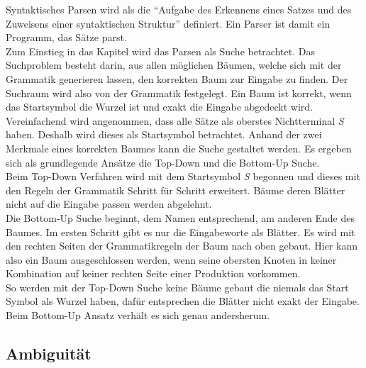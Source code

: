 Syntaktisches Parsen wird als die ``Aufgabe des Erkennens eines Satzes und des Zuweisens einer syntaktischen Struktur'' definiert. %
Ein Parser ist damit ein Programm, das Sätze parst.\\
Zum Einstieg in das Kapitel wird das Parsen als Suche betrachtet. Das Suchproblem besteht darin, aus allen möglichen Bäumen, welche sich mit der Grammatik generieren lassen, den korrekten Baum zur Eingabe zu finden. Der Suchraum wird also von der Grammatik festgelegt. Ein Baum ist korrekt, wenn das Startsymbol die Wurzel ist und exakt die Eingabe abgedeckt wird. Vereinfachend wird angenommen, dass alle Sätze als oberstes Nichtterminal \textit{S} haben. Deshalb wird dieses als Startsymbol betrachtet. Anhand der zwei Merkmale eines korrekten Baumes kann die Suche gestaltet werden. Es ergeben sich als grundlegende Ansätze die Top-Down und die Bottom-Up Suche. \\
Beim Top-Down Verfahren wird mit dem Startsymbol \textit{S} begonnen und dieses mit den Regeln der Grammatik Schritt für Schritt erweitert. Bäume deren Blätter nicht auf die Eingabe passen werden abgelehnt. \\
Die Bottom-Up Suche beginnt, dem Namen entsprechend, am anderen Ende des Baumes. Im ersten Schritt gibt es nur die Eingabeworte als Blätter. Es wird mit den rechten Seiten der Grammatikregeln der Baum nach oben gebaut. Hier kann also ein Baum ausgeschlossen werden, wenn seine obersten Knoten in keiner Kombination auf keiner rechten Seite einer Produktion vorkommen. \\
So werden mit der Top-Down Suche keine Bäume gebaut die niemals das Start Symbol als Wurzel haben, dafür entsprechen die Blätter nicht exakt der Eingabe. Beim Bottom-Up Ansatz verhält es sich genau andersherum.
\subsection{Ambiguität}

